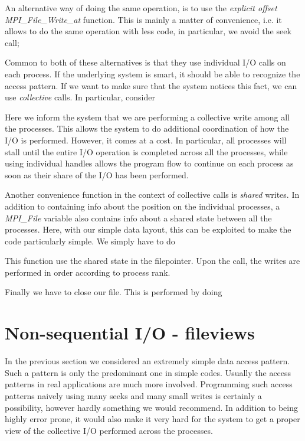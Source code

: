\documentclass[twoside, 11pt, a4paper]{article}
\begin{document}
An alternative way of doing the same operation, is to use the \emph{explicit offset}
\emph{MPI\_File\_Write\_at} function. This is mainly a matter of convenience, i.e.
it allows to do the same operation with less code, in particular, we avoid the 
seek call;


Common to both of these alternatives is that they use individual I/O calls on each
process. If the underlying system is smart, it should be able to recognize the access
pattern. If we want to make sure that the system notices this fact, we can use
\emph{collective} calls. In particular, consider

Here we inform the system that we are performing a collective write among all the
processes. This allows the system to do additional coordination of how the I/O is 
performed. However, it comes at a cost. In particular, all processes will stall 
until the entire I/O operation is completed across all the processes, while
using individual handles allows the program flow to continue on each process as
soon as their share of the I/O has been performed.

Another convenience function in the context of collective calls is \emph{shared} writes.
In addition to containing info about the position on the individual processes, a 
\emph{MPI\_File} variable also contains info about a shared state between all the
processes. Here, with our simple data layout, this can be exploited to make the code
particularly simple. We simply have to do

This function use the shared state in the filepointer. Upon the call, the writes are
performed in order according to process rank.

Finally we have to close our file. This is performed by doing


\section{Non-sequential I/O - fileviews}
In the previous section we considered an extremely simple data access pattern. Such a
pattern is only the predominant one in simple codes. Usually the access patterns
in real applications are much more involved. Programming such access patterns naively 
using many seeks and many small writes is certainly a possibility, however hardly something 
we would recommend. In addition to being highly error prone, it would also make it 
very hard for the system to get a proper view of the collective I/O performed across 
the processes.
\end{document}
